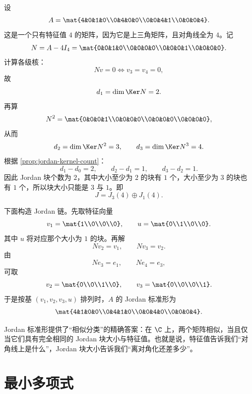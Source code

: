 \begin{example}[一个 \(4\times 4\) 例子]\label{ex:jordan-4x4}
设
\[
A=\mat{4&0&1&0\\0&4&0&0\\0&0&4&1\\0&0&0&4}.
\]
这是一个只有特征值 \(4\) 的矩阵，因为它是上三角矩阵，且对角线全为 \(4\)。记
\[
N=A-4I_4=\mat{0&0&1&0\\0&0&0&0\\0&0&0&1\\0&0&0&0}.
\]
计算各级核：
\[
Nv=0 \iff v_3=v_4=0,
\]
故
\[
d_1=\dim\Ker N=2.
\]
再算
\[
N^2=\mat{0&0&0&1\\0&0&0&0\\0&0&0&0\\0&0&0&0},
\]
从而
\[
d_2=\dim\Ker N^2=3,
\qquad d_3=\dim\Ker N^3=4.
\]
根据 \cref{prop:jordan-kernel-count}：
\[
d_1-d_0=2,
\qquad d_2-d_1=1,
\qquad d_3-d_2=1.
\]
因此 Jordan 块个数为 \(2\)，其中大小至少为 \(2\) 的块有 \(1\) 个，大小至少为 \(3\) 的块也有 \(1\) 个，所以块大小只能是 \(3\) 与 \(1\)。即
\[
J=J_3(4)\oplus J_1(4).
\]

下面构造 Jordan 链。先取特征向量
\[
v_1=\mat{1\\0\\0\\0},
\qquad u=\mat{0\\1\\0\\0}.
\]
其中 \(u\) 将对应那个大小为 \(1\) 的块。再解
\[
Nv_2=v_1,
\qquad Nv_3=v_2.
\]
由
\[
Ne_3=e_1,
\qquad Ne_4=e_3,
\]
可取
\[
v_2=\mat{0\\0\\1\\0},
\qquad v_3=\mat{0\\0\\0\\1}.
\]
于是按基 \((v_1,v_2,v_3,u)\) 排列时，\(A\) 的 Jordan 标准形为
\[
\mat{4&1&0&0\\0&4&1&0\\0&0&4&0\\0&0&0&4}.
\]
\end{example}

\begin{remark}
Jordan 标准形提供了“相似分类”的精确答案：在 \(\C\) 上，两个矩阵相似，当且仅当它们具有完全相同的 Jordan 块大小与特征值。也就是说，特征值告诉我们“对角线上是什么”，Jordan 块大小告诉我们“离对角化还差多少”。
\end{remark}

\section{最小多项式}\label{sec:minimal-polynomial}

